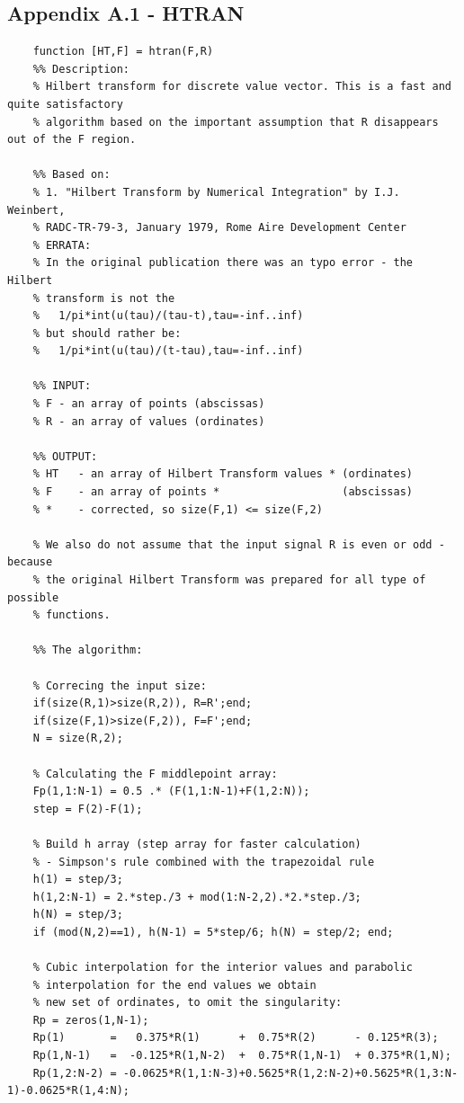 \documentclass[12pt,twoside,a4paper]{article}
\numberwithin{equation}{subsection}
\numberwithin{figure}{subsection}
\begin{document}
\subsection*{Appendix A.1 - HTRAN}
\begin{lstlisting}
	function [HT,F] = htran(F,R)
    %% Description:
    % Hilbert transform for discrete value vector. This is a fast and quite satisfactory 
    % algorithm based on the important assumption that R disappears out of the F region.

    %% Based on:
    % 1. "Hilbert Transform by Numerical Integration" by I.J. Weinbert, 
    % RADC-TR-79-3, January 1979, Rome Aire Development Center
    % ERRATA:
    % In the original publication there was an typo error - the Hilbert
    % transform is not the 
    %   1/pi*int(u(tau)/(tau-t),tau=-inf..inf) 
    % but should rather be:
    %   1/pi*int(u(tau)/(t-tau),tau=-inf..inf) 

    %% INPUT:
    % F - an array of points (abscissas)
    % R - an array of values (ordinates)

    %% OUTPUT:
    % HT   - an array of Hilbert Transform values * (ordinates)
    % F    - an array of points *                   (abscissas) 
    % *    - corrected, so size(F,1) <= size(F,2)

    % We also do not assume that the input signal R is even or odd - because
    % the original Hilbert Transform was prepared for all type of possible
    % functions.

    %% The algorithm:

    % Correcing the input size:
    if(size(R,1)>size(R,2)), R=R';end;
    if(size(F,1)>size(F,2)), F=F';end;
    N = size(R,2);

    % Calculating the F middlepoint array:
    Fp(1,1:N-1) = 0.5 .* (F(1,1:N-1)+F(1,2:N));
    step = F(2)-F(1);

    % Build h array (step array for faster calculation) 
    % - Simpson's rule combined with the trapezoidal rule
    h(1) = step/3;
    h(1,2:N-1) = 2.*step./3 + mod(1:N-2,2).*2.*step./3;
    h(N) = step/3;
    if (mod(N,2)==1), h(N-1) = 5*step/6; h(N) = step/2; end;

    % Cubic interpolation for the interior values and parabolic 
    % interpolation for the end values we obtain
    % new set of ordinates, to omit the singularity:
    Rp = zeros(1,N-1);
    Rp(1)       =   0.375*R(1)      +  0.75*R(2)      - 0.125*R(3);
    Rp(1,N-1)   =  -0.125*R(1,N-2)  +  0.75*R(1,N-1)  + 0.375*R(1,N);
    Rp(1,2:N-2) = -0.0625*R(1,1:N-3)+0.5625*R(1,2:N-2)+0.5625*R(1,3:N-1)-0.0625*R(1,4:N);


\end{lstlisting}
\end{document}
